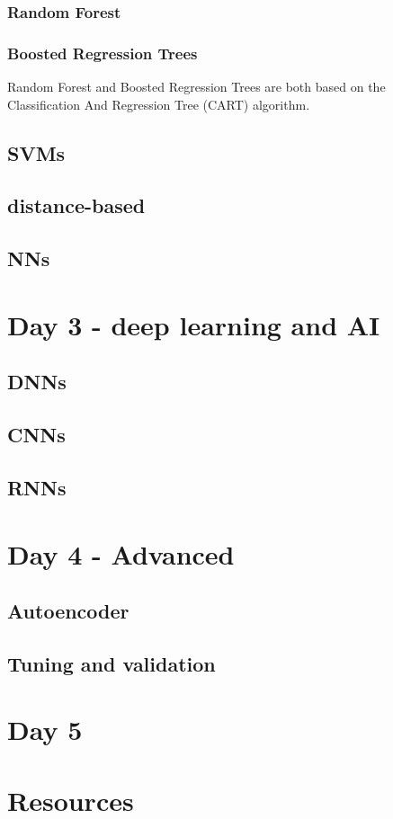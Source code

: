 \documentclass[a4paper,twoside]{tufte-book}\usepackage[]{graphicx}\usepackage[]{color}
\begin{document}
\subsection{Random Forest}
\citep[BRT,][]{Friedman2001}

\subsection{Boosted Regression Trees}
\citep[RF,][]{Breiman2001a}

%
Random Forest \citep[RF,][]{Breiman2001a} and Boosted Regression Trees \citep[BRT,][]{Friedman2001} are both based on the Classification And Regression Tree (CART) algorithm.
%

\section{SVMs}

\section{distance-based}


\section{NNs}


\chapter{Day 3 - deep learning and AI}

\section{DNNs}

\section{CNNs}

\section{RNNs}

\chapter{Day 4 - Advanced}

\section{Autoencoder}

\section{Tuning and validation}


\chapter{Day 5}





\chapter{Resources}




\end{document}
